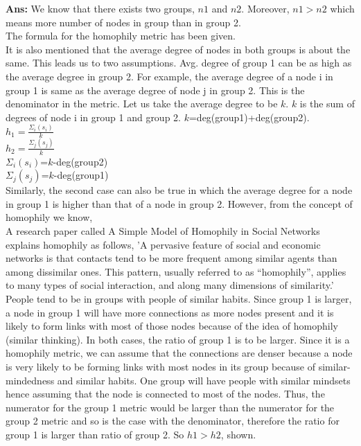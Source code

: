 \documentclass[answers]{exam}
\begin{document}
\begin{questions}
\begin{framed}
\textbf{Ans:} We know that there exists two groups, $n1$ and $n2$. Moreover, $n1 > n2$ which means more number of nodes in group than in group 2. \\ The formula for the homophily metric has been given. \\ It is also mentioned that the average degree of nodes in both groups is about the same. This leads us to two assumptions. Avg. degree of group 1 can be as high as the average degree in group 2. For example, the average degree of a node i in group 1 is same as the average degree of node j in group 2. This is the denominator in the metric. Let us take the average degree to be $k$. $k$ is the sum of degrees of node i in group 1 and group 2. $k$=deg(group1)+deg(group2).\\
$h_1=\frac{\Sigma_i(s_i)}{k}$\\
$h_2=\frac{\Sigma_j(s_j)}{k}$ \\
$\Sigma_i(s_i)$=$k$-deg(group2)\\
$\Sigma_j(s_j)$=$k$-deg(group1)\\
Similarly, the second case can also be true in which the average degree for a node in group 1 is higher than that of a node in group 2. However,
from the concept of homophily we know, \\ A research paper called A Simple Model of Homophily in Social Networks explains homophily as follows, 'A pervasive feature of social and economic networks is that contacts tend to be more frequent
among similar agents than among dissimilar ones. This pattern, usually referred to as “homophily”,
applies to many types of social interaction, and along many dimensions of similarity.'\\ People tend to be in groups with people of similar habits. Since group 1 is larger, a node in group 1 will have more connections as more nodes present and it is likely to form links with most of those nodes because of the idea of homophily (similar thinking). In both cases, the ratio of group 1 is to be larger. Since it is a homophily metric, we can assume that the connections are denser because a node is very likely to be forming links with most nodes in its group because of similar-mindedness and similar habits. One group will have people with similar mindsets hence assuming that the node is connected to most of the nodes. Thus, the numerator for the group 1 metric would be larger than the numerator for the group 2 metric and so is the case with the denominator, therefore the ratio for group 1 is larger than ratio of group 2. So $h1 > h2$, shown. \\


\end{framed}
\end{questions}
\end{document}
